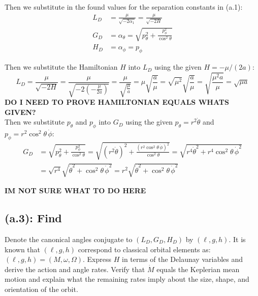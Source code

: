 \documentclass[titlepage]{article}
\begin{document}
Then we substitute in the found values for the separation constants in (a.1):
\begin{equation}
	\begin{split}
		L_D&=\frac{\mu}{\sqrt{-2\alpha_1}}=\frac{\mu}{\sqrt{-2H}} \\
		G_D&=\alpha_\theta=\sqrt{p_\theta^2 + \frac{p_\phi^2}{\cos^2\theta}}\\
		H_D&=\alpha_\phi=p_\phi 
	\end{split}
\end{equation}

Then we substitute the Hamiltonian $H$ into $L_D$ using the given $H=-\mu/(2a)$:
\begin{equation}
	L_D=\frac{\mu}{\sqrt{-2H}}=\frac{\mu}{\sqrt{-2\left(-\frac{\mu}{2a}\right)}}=\frac{\mu}{\sqrt{\frac{\mu}{a}}}=\mu\sqrt{\frac{a}{\mu}}=\sqrt{\mu^2}\sqrt{\frac{a}{\mu}}=\sqrt{\frac{\mu^2a}{\mu}}=\sqrt{\mu a}
\end{equation}
\textbf{DO I NEED TO PROVE HAMILTONIAN EQUALS WHATS GIVEN?} \\

Then we substitute $p_\theta$ and $p_\phi$ into $G_D$ using the given $p_\theta=r^2\dot{\theta}$ and $p_\phi=r^2\cos^2\theta\,\dot{\phi}$:
\begin{equation}
	\begin{split}
		G_D&=\sqrt{p_\theta^2+\frac{p_\phi^2}{\cos^2\theta}}=\sqrt{\left(r^2\dot{\theta}\right)^2+\frac{\left(r^2\cos^2\theta\,\dot{\phi}\right)^2}{\cos^2\theta}}=\sqrt{r^4\dot{\theta}^2+r^4\cos^2\theta\,\dot{\phi}^2} \\
		&=\sqrt{r^4}\sqrt{\dot{\theta}^2+\cos^2\theta\,\dot{\phi}^2}=r^2\sqrt{\dot{\theta}^2+\cos^2\theta\,\dot{\phi}^2}
	\end{split}
\end{equation}

\textbf{IM NOT SURE WHAT TO DO HERE} \\

\subsection*{(a.3): Find}

Denote the canonical angles conjugate to $(L_D,G_D,H_D)$ by $(\ell,g,h)$. It is known that $(\ell,g,h)$ correspond to classical orbital elements as: $(\ell,g,h)=(M,\omega,\Omega)$. Express $H$ in terms of the Delaunay variables and derive the action and angle rates. Verify that $\dot{M}$ equals the Keplerian mean motion and explain what the remaining rates imply about the size, shape, and orientation of the orbit. \\
\end{document}
